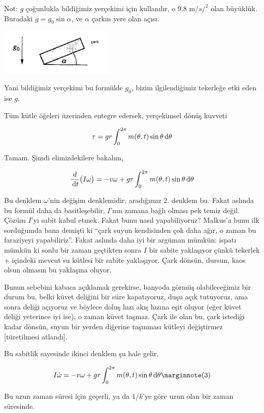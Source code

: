 \documentclass[12pt,fleqn]{article}\usepackage{../../common}
\begin{document}
Not: $g$ çoğunlukla bildiğimiz yerçekimi için kullanılır, o 9.8 m/$s/^2$
olan büyüklük. Buradaki $g = g_0 \sin \alpha$, ve $\alpha$ çarkın yere olan
açısı. 

\includegraphics[width=15em]{15_06.png}

Yani bildiğimiz yerçekimi bu formülde $g_0$, bizim ilgilendiğimiz tekerleğe
etki eden ise $g$. 

Tüm kütle öğeleri üzerinden entegre edersek, yerçekimsel dönüş kuvveti

$$ 
\tau = gr \int _{0}^{2\pi} m(\theta, t) \sin\theta\,\mathrm{d}\theta
$$

Tamam. Şimdi elimizdekilere bakalım, 

$$ 
\frac{d}{\,\mathrm{d} t} \big( I\omega \big) = 
-v \omega + gr  \int _{0}^{2\pi} m(\theta, t) \sin\theta\,\mathrm{d}\theta
$$

Bu denklem $\omega$'nin değişim denklemidir, aradığımız 2. denklem
bu. Fakat aslında bu formül daha da basitleşebilir, $I$'nın zamana bağlı
olması pek temiz değil. Çözüm $I$'yı sabit kabul etmek. Fakat bunu nasıl
yapabiliyoruz? Malkus'a bunu ilk sorduğumda bana demişti ki ``çark suyun
kendisinden çok daha ağır, o zaman bu faraziyeyi yapabiliriz''. Fakat
aslında daha iyi bir argüman mümkün: ispatı mümkün ki sonlu bir zaman
geçtikten sonra $I$ bir sabite yaklaşıyor çünkü tekerlek + içindeki mevcut
su kütlesi bir sabite yaklaşıyor. Çark dönsün, dursun, kaos olsun olmasın
bu yaklaşma oluyor.

Bunun sebebini kabaca açıklamak gerekirse, banyoda görmüş olabileceğimiz
bir durum bu, belki küvet deliğini bir süre kapatıyoruz, duşu açık
tutuyoruz, ama sonra deliği açıyoruz ve böylece doluş hızı akış hızına eşit
oluyor (eğer küvet deliği yeterince iyi ise), o zaman küvet taşmaz. Çark
ile olan bu, çark istediği kadar dönsün, suyun bir yerden diğerine
taşınması kütleyi değiştirmez [türetilmesi atlandı].

Bu sabitlik sayesinde ikinci denklem şu hale gelir, 

$$ 
I\dot{\omega} = -v\omega + gr \int _{0}^{2\pi} m(\theta,t) \sin\theta
\ud\theta 
\mlabel{3}
$$

Bu uzun zaman süresi için geçerli, ya da $1/k$'ye göre uzun olan bir zaman
süresinde. 
\end{document}
